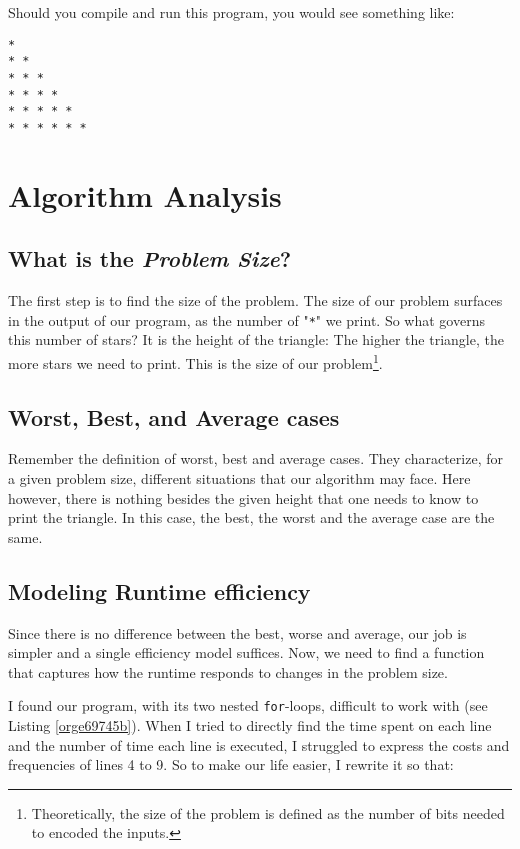 \documentclass[11pt]{article}
\begin{document}
Should you compile and run this program, you would see something like:
\begin{verbatim}
* 
* * 
* * * 
* * * * 
* * * * * 
* * * * * * 
\end{verbatim}

\section{Algorithm Analysis}
\label{sec:org176cceb}

\subsection{What is the \emph{Problem Size}?}
\label{sec:orgb5cd914}

The first step is to find the size of the problem. The size of our
problem surfaces in the output of our program, as the number of "\texttt{*}"
we print. So what governs this number of stars? It is the
height of the triangle: The higher the triangle, the more stars we
need to print. This is the size of our problem\footnote{Theoretically, the size of the problem is defined as the number
of bits needed to encoded the inputs.}.

\subsection{Worst, Best, and Average cases}
\label{sec:orgd0ddf91}

Remember the definition of worst, best and average cases. They
characterize, for a given problem size, different situations that
our algorithm may face. Here however, there is nothing besides the
given height that one needs to know to print the triangle. In this
case, the best, the worst and the average case are the same.

\subsection{Modeling Runtime efficiency}
\label{sec:org59f890e}

Since there is no difference between the best, worse and average,
our job is simpler and a single efficiency model suffices. Now, we
need to find a function that captures how the runtime responds to
changes in the problem size.

I found our program, with its two nested \texttt{for}-loops, difficult to
work with (see Listing \ref{orge69745b}). When I tried to directly
find the time spent on each line and the number of time each line is
executed, I struggled to express the costs and frequencies of lines
4 to 9. So to make our life easier, I rewrite it so
that:
\end{document}
